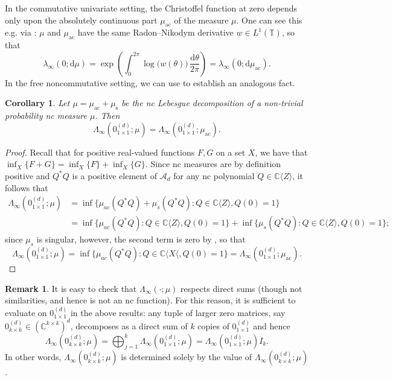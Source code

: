 \documentclass[11pt,reqno]{amsart}
\def\l{\lambda}
\def\th{\theta}
\def\L{\Lambda}
\def\rmd{\mathrm{d}}
\def\CC{\mathbb{C}}
\def\TT{\mathbb{T}}
\def\ac{\mathrm{ac}}
\def\rms{\mathrm{s}}
\def\scrA{\mathscr{A}}
\newtheorem{corollary}[theorem]{Corollary}
\theoremstyle{definition}
\newtheorem{remark}[theorem]{Remark}
\numberwithin{equation}{section}
\begin{document}
In the commutative univariate setting, the Christoffel function at zero depends only upon the absolutely continuous part \(\mu_{\ac}\) of the measure \(\mu\). One can see this e.g. via : \(\mu\) and \(\mu_{\ac}\) have the same Radon--Nikodym derivative \(w \in L^1(\TT)\), so that
\[
    \l_{\infty}(0; \rmd\mu) = \exp\left(\int_0^{2\pi} \log\big(w(\th)\big) \, \frac{\rmd\th}{2\pi}\right) = \l_{\infty}(0; \rmd\mu_{\ac}).
\]
In the free noncommutative setting, we can use  to establish an analogous fact.

\begin{corollary}
    \label{cor:CFDependsOnAC}
    Let \(\mu = \mu_{\ac} + \mu_{\rms}\) be the nc Lebesgue decomposition of a non-trivial probability nc measure \(\mu\). Then
    \[
        \L_{\infty}(0^{(d)}_{1\times1}; \mu) = \L_{\infty}(0^{(d)}_{1\times1}; \mu_{\ac}).
    \]
\end{corollary}
\begin{proof}
    Recall that for positive real-valued functions \(F,G\) on a set \(X\), we have that \(\inf_X\{F + G\} = \inf_X\{F\} + \inf_X\{G\}\). Since nc measures are by definition positive and \(Q^*Q\) is a positive element of \(\scrA_d\) for any nc polynomial \(Q \in \CC\langle Z \rangle\), it follows that
        \begin{align*}
             \L_{\infty}(0_{1 \times 1}^{(d)}; \mu) & = \inf\{\mu_{ac}(Q^*Q) + \mu_{s}(Q^*Q) : Q \in \CC\langle Z \rangle, Q(0) = 1\} \\
             & =  \inf\{\mu_{ac}(Q^*Q) : Q \in \CC\langle Z \rangle, Q(0) = 1\} +  \inf\{\mu_{s}(Q^*Q) : Q \in \CC\langle Z \rangle, Q(0) = 1\};
        \end{align*}
        since \(\mu_s\) is singular, however, the second term is zero by , so that
        \[
            \L_{\infty}(0_{1 \times 1}^{(d)}; \mu) = \inf\{\mu_{ac}(Q^*Q) : Q \in \CC\langle X \langle, Q(0) = 1\} = \L_{\infty}(0^{(d)}_{1\times1}; \mu_{\ac}).
        \]
\end{proof}

\begin{remark}
    It is easy to check that \(\L_{\infty}(\cdot; \mu)\) respects direct sums (though not similarities, and hence is not an nc function). For this reason, it is sufficient to evaluate on \(0_{1 \times 1}^{(d)}\) in the above results: any tuple of larger zero matrices, say \(0_{k\times k}^{(d)} \in (\CC^{k\times k})^d\), decomposes as a direct sum of \(k\) copies of \(0_{1 \times 1}^{(d)}\) and hence
    \[
        \L_{\infty}(0_{k\times k}^{(d)}; \mu) = \bigoplus_{j=1}^{k} \L_{\infty}(0_{1\times 1}^{(d)}; \mu) = \L_{\infty}(0_{1\times 1}^{(d)}; \mu) I_k.
    \]
    In other words, \(\L_{\infty}(0_{k\times k}^{(d)}; \mu)\) is determined solely by the value of \(\L_{\infty}(0_{k\times k}^{(d)}; \mu)\).
\end{remark}
\end{document}

